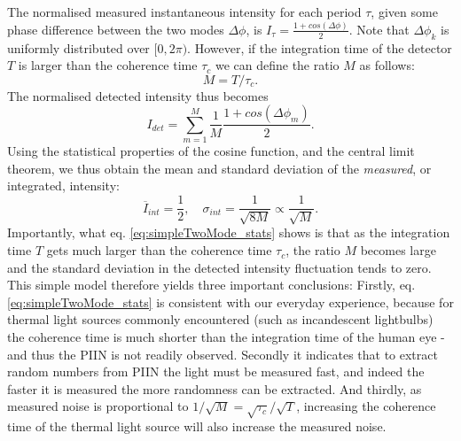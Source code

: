 \documentclass[]{article}
\newcommand*\mean[1]{\overline{#1}}
\begin{document}
	The normalised measured instantaneous intensity for each period $\tau$, given some phase difference between the two modes $\Delta \phi$, is $I_{\tau} = \frac{1+cos(\Delta \phi)}{2}$. Note that $\Delta \phi_k$ is uniformly distributed over $[0,2\pi)$. However, if the integration time of the detector $T$ is larger than the coherence time $\tau_c$ we can define the ratio $M$ as follows:
		\begin{equation}
		M = T/\tau_c.
		\end{equation}
	The normalised detected intensity thus becomes
		\begin{equation}
		I_{det} = \sum_{m=1}^M \frac{1}{M} \frac{1+cos(\Delta \phi_m)}{2}.
		\end{equation}
	Using the statistical properties of the cosine function, and the central limit theorem, we thus obtain the mean and standard deviation of the \textit{measured}, or integrated, intensity:
		\begin{equation}
		\mean{I}_{int} = \frac{1}{2}, \quad \sigma_{int} = \frac{1}{\sqrt{8M}} \propto \frac{1}{\sqrt{M}} \label{eq:simpleTwoMode_stats}.
		\end{equation}
	Importantly, what eq. \ref{eq:simpleTwoMode_stats} shows is that as the integration time $T$ gets much larger than the coherence time $\tau_c$, the ratio $M$ becomes large and the standard deviation in the detected intensity fluctuation tends to zero. This simple model therefore yields three important conclusions: Firstly, eq. \ref{eq:simpleTwoMode_stats} is consistent with our everyday experience, because for thermal light sources commonly encountered (such as incandescent lightbulbs) the coherence time is much shorter than the integration time of the human eye - and thus the PIIN is not readily observed. Secondly it indicates that to extract random numbers from PIIN the light must be measured fast, and indeed the faster it is measured the more randomness can be extracted. And thirdly, as measured noise is proportional to $1/\sqrt{M} = \sqrt{\tau_c}/\sqrt{T}$, increasing the coherence time of the thermal light source will also increase the measured noise.
	
\end{document}
